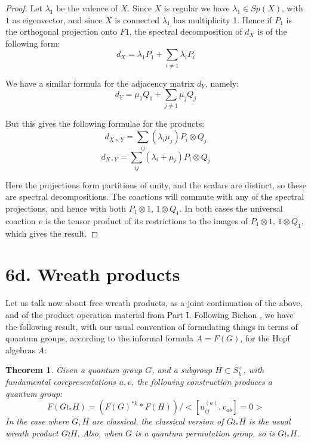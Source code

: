 \documentclass[12pt]{amsbook}
\newtheorem{theorem}{Theorem}[chapter]
\begin{document}
\begin{proof}
Let $\lambda_1$ be the valence of $X$. Since $X$ is regular we have $\lambda_1\in Sp(X)$, with $1$ as eigenvector, and since $X$ is connected $\lambda_1$ has multiplicity 1. Hence if $P_1$ is the orthogonal projection onto $F1$, the spectral decomposition of $d_X$ is of the following form:
$$d_X=\lambda_1P_1+\sum_{i\neq1}\lambda_iP_i$$

We have a similar formula for the adjacency matrix $d_Y$, namely:
$$d_Y=\mu_1Q_1+\sum_{j\neq1}\mu_jQ_j$$

But this gives the following formulae for the products:
$$d_{X\times Y}=\sum_{ij}(\lambda_i\mu_j)P_{i}\otimes Q_{j}$$
$$d_{X\,\square\,Y}=\sum_{ij}(\lambda_i+\mu_i)P_i\otimes Q_j$$

Here the projections form partitions of unity, and the scalars are distinct, so these are spectral decompositions. The coactions will commute with any of the spectral projections, and hence with both $P_1\otimes1$, $1\otimes Q_1$. In both cases the universal coaction $v$ is the tensor product of its restrictions to the images of $P_1\otimes1$, $1\otimes Q_1$, which gives the result.
\end{proof}

\section*{6d. Wreath products} 

Let us talk now about free wreath products, as a joint continuation of the above, and of the product operation material from Part I. Following Bichon \cite{bi2}, we have the following result, with our usual convention of formulating things in terms of quantum groups, according to the informal formula $A=F(G)$, for the Hopf algebras $A$:


\begin{theorem}
Given a quantum group $G$, and a subgroup $H\subset S_k^+$, with fundamental corepresentations $u,v$, the following construction produces a quantum group:
$$F(G\wr_*H)=(F(G)^{*k}*F(H))/<[u_{ij}^{(a)},v_{ab}]=0>$$
In the case where $G,H$ are classical, the classical version of $G\wr_*H$ is the usual wreath product $G\wr H$. Also, when $G$ is a quantum permutation group, so is $G\wr_*H$.
\end{theorem}
\end{document}
